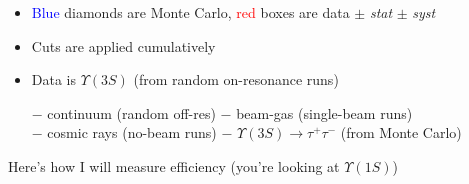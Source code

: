 \documentclass[landscape]{article}
\begin{document}
\begin{itemize}

\vfill
  \item \textcolor{blue}{Blue} diamonds are Monte Carlo, \textcolor{red}{red} boxes are data $\pm$ {\it stat} $\pm$ {\it syst}

\vfill
  \item Cuts are applied cumulatively

\vfill
  \item Data is $\Upsilon(3S)$ (from random on-resonance runs) \\

  \vspace{-0.7\baselineskip}
  \hspace{1 cm} \begin{minipage}{0.9\linewidth} $-$
  continuum (random off-res) $-$ beam-gas (single-beam runs) \\ $-$
  cosmic rays (no-beam runs) $-$ $\Upsilon(3S) \to \tau^+ \tau^-$ (from
  Monte Carlo) \end{minipage}

\end{itemize}

\vfill
\pagebreak

Here's how I will measure efficiency (you're looking at $\Upsilon(1S)$)
\vspace{1 cm}
\end{document}
